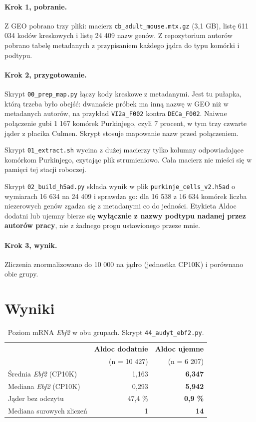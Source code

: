 \documentclass[a4paper,11pt]{report}
\begin{document}
\paragraph{Krok 1, pobranie.}
Z GEO pobrano trzy pliki: macierz \texttt{cb\_adult\_mouse.mtx.gz} (3,1 GB),
listę 611 034 kodów kreskowych i listę 24 409 nazw genów. Z repozytorium autorów
pobrano tabelę metadanych z przypisaniem każdego jądra do typu komórki i podtypu.

\paragraph{Krok 2, przygotowanie.}
Skrypt \texttt{00\_prep\_map.py} łączy kody kreskowe z metadanymi. Jest tu pułapka,
którą trzeba było obejść: dwanaście próbek ma inną nazwę w GEO niż w metadanych
autorów, na przykład \texttt{VI2a\_F002} kontra \texttt{DECa\_F002}. Naiwne połączenie
gubi 1 167 komórek Purkinjego, czyli 7 procent, w tym trzy czwarte jąder z płacika
Culmen. Skrypt stosuje mapowanie nazw przed połączeniem.

Skrypt \texttt{01\_extract.sh} wycina z dużej macierzy tylko kolumny odpowiadające
komórkom Purkinjego, czytając plik strumieniowo. Cała macierz nie mieści się
w pamięci tej stacji roboczej.

Skrypt \texttt{02\_build\_h5ad.py} składa wynik w plik \texttt{purkinje\_cells\_v2.h5ad}
o wymiarach 16 634 na 24 409 i sprawdza go: dla 16 538 z 16 634 komórek liczba
niezerowych genów zgadza się z metadanymi co do jedności. Etykieta Aldoc dodatni
lub ujemny bierze się \textbf{wyłącznie z nazwy podtypu nadanej przez autorów pracy},
nie z żadnego progu ustawionego przeze mnie.

\paragraph{Krok 3, wynik.}
Zliczenia znormalizowano do 10 000 na jądro (jednostka CP10K) i porównano obie grupy.

\section{Wyniki}

\begin{table}[h]
\centering
\begin{tabular}{lrr}
\toprule
 & \textbf{Aldoc dodatnie} & \textbf{Aldoc ujemne} \\
 & (n = 10 427) & (n = 6 207) \\
\midrule
Średnia \textit{Ebf2} (CP10K) & 1,163 & \textbf{6,347} \\
Mediana \textit{Ebf2} (CP10K) & 0,293 & \textbf{5,942} \\
Jąder bez odczytu & 47,4 \% & \textbf{0,9 \%} \\
Mediana surowych zliczeń & 1 & \textbf{14} \\
\bottomrule
\end{tabular}
\caption{Poziom mRNA \textit{Ebf2} w obu grupach. Skrypt \texttt{44\_audyt\_ebf2.py}.}
\end{table}
\end{document}
